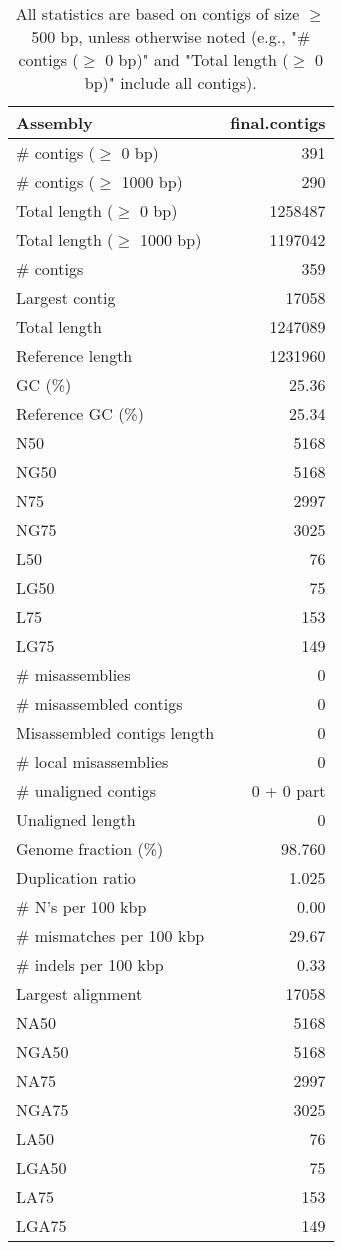 \documentclass[12pt,a4paper]{article}
\begin{document}
\begin{table}[ht]
\begin{center}
\caption{All statistics are based on contigs of size $\geq$ 500 bp, unless otherwise noted (e.g., "\# contigs ($\geq$ 0 bp)" and "Total length ($\geq$ 0 bp)" include all contigs).}
\begin{tabular}{|l*{1}{|r}|}
\hline
Assembly & final.contigs \\ \hline
\# contigs ($\geq$ 0 bp) & 391 \\ \hline
\# contigs ($\geq$ 1000 bp) & 290 \\ \hline
Total length ($\geq$ 0 bp) & 1258487 \\ \hline
Total length ($\geq$ 1000 bp) & 1197042 \\ \hline
\# contigs & 359 \\ \hline
Largest contig & 17058 \\ \hline
Total length & 1247089 \\ \hline
Reference length & 1231960 \\ \hline
GC (\%) & 25.36 \\ \hline
Reference GC (\%) & 25.34 \\ \hline
N50 & 5168 \\ \hline
NG50 & 5168 \\ \hline
N75 & 2997 \\ \hline
NG75 & 3025 \\ \hline
L50 & 76 \\ \hline
LG50 & 75 \\ \hline
L75 & 153 \\ \hline
LG75 & 149 \\ \hline
\# misassemblies & 0 \\ \hline
\# misassembled contigs & 0 \\ \hline
Misassembled contigs length & 0 \\ \hline
\# local misassemblies & 0 \\ \hline
\# unaligned contigs & 0 + 0 part \\ \hline
Unaligned length & 0 \\ \hline
Genome fraction (\%) & 98.760 \\ \hline
Duplication ratio & 1.025 \\ \hline
\# N's per 100 kbp & 0.00 \\ \hline
\# mismatches per 100 kbp & 29.67 \\ \hline
\# indels per 100 kbp & 0.33 \\ \hline
Largest alignment & 17058 \\ \hline
NA50 & 5168 \\ \hline
NGA50 & 5168 \\ \hline
NA75 & 2997 \\ \hline
NGA75 & 3025 \\ \hline
LA50 & 76 \\ \hline
LGA50 & 75 \\ \hline
LA75 & 153 \\ \hline
LGA75 & 149 \\ \hline
\end{tabular}
\end{center}
\end{table}
\end{document}
